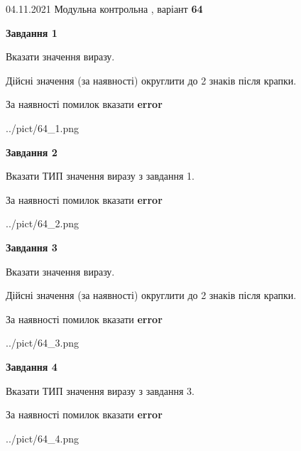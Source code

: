\documentclass[11pt, ukrainian]{article}
\begin{document}
{04.11.2021 Модульна контрольна , варіант  \No \textbf { 64 }\par}
{
\begin {large}
{\begin {center}\textbf{Завдання 1}\end {center}}\par
Вказати значення виразу. \par
Дійсні значення (за наявності) округлити до 2 знаків після крапки. \par
За наявності помилок вказати \textbf{error}

\begin{center}
	{../pict/64_1.png}
\end{center}
\newpage

{\begin {center}\textbf{Завдання 2}\end {center}}\par
Вказати ТИП значення виразу з завдання 1. \par
За наявності помилок вказати \textbf{error}

\begin{center}
	{../pict/64_2.png}
\end{center}
\newpage

{\begin {center}\textbf{Завдання 3}\end {center}}\par
Вказати значення виразу. \par
Дійсні значення (за наявності) округлити до 2 знаків після крапки. \par
За наявності помилок вказати \textbf{error}

\begin{center}
	{../pict/64_3.png}
\end{center}
\newpage

{\begin {center}\textbf{Завдання 4}\end {center}}\par
Вказати ТИП значення виразу з завдання 3. \par
За наявності помилок вказати \textbf{error}

\begin{center}
	{../pict/64_4.png}
\end{center}
\newpage


\end{large}}
\end{document}
